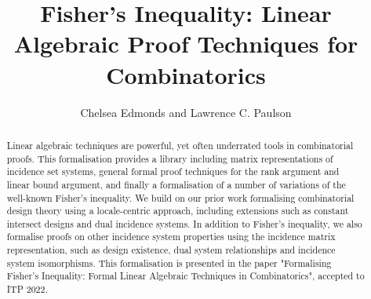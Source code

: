 \documentclass[11pt,a4paper]{article}
\begin{document}
\title{Fisher's Inequality: Linear Algebraic Proof Techniques for Combinatorics}
\author{Chelsea Edmonds and Lawrence C. Paulson}
\maketitle

\begin{abstract}
  Linear algebraic techniques are powerful, yet often underrated tools in combinatorial proofs. This formalisation provides a library including matrix representations of incidence set systems, general formal proof techniques for the rank argument and linear bound argument, and finally a formalisation of a number of variations of the well-known Fisher's inequality. We build on our prior work formalising combinatorial design theory using a locale-centric approach, including extensions such as constant intersect designs and dual incidence systems. In addition to Fisher's inequality, we also formalise proofs on other incidence system properties using the incidence matrix representation, such as design existence, dual system relationships and incidence system isomorphisms. This formalisation is presented in the paper "Formalising Fisher's Inequality: Formal Linear Algebraic Techniques in Combinatorics", accepted to ITP 2022.
\end{abstract}

\tableofcontents





\end{document}
